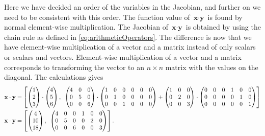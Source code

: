 Here we have decided an order of the variables in the Jacobian, and further on we need to be consistent with this order. The function value of $\textbf{x}\cdot\textbf{y}$ is found by normal element-wise multiplication. The Jacobian of $\textbf{x}\cdot\textbf{y}$ is obtained by using the chain rule as defined in \eqref{eq:arithmeticOperators}. The difference is now that we have element-wise multiplication of a vector and a matrix instead of only scalars or scalars and vectors. Element-wise multiplication of a vector and a matrix corresponds to transforming the vector to an $n\times n$ matrix with the values on the diagonal. The calculations gives
\begin{align*}
    \textbf{x}\cdot\textbf{y} &= \left[\begin{pmatrix}
        1\\2\\3
        \end{pmatrix}
        \cdot
        \begin{pmatrix}
        4\\5\\6
        \end{pmatrix}
    ,\hspace{0.5em}
        \begin{pmatrix}
        4&0&0\\
        0&5&0\\
        0&0&6\end{pmatrix}
        \cdot
        \begin{pmatrix}
        1&0&0&0&0&0\\
        0&1&0&0&0&0\\
        0&0&1&0&0&0
        \end{pmatrix}
        +
        \begin{pmatrix}
        1&0&0\\
        0&2&0\\
        0&0&3
        \end{pmatrix}
        \cdot
        \begin{pmatrix}
        0&0&0&1&0&0\\
        0&0&0&0&1&0\\
        0&0&0&0&0&1
        \end{pmatrix}\right]
        \\
        \textbf{x}\cdot\textbf{y} &= \left[
        \begin{pmatrix}
        4\\10\\18
        \end{pmatrix}
        ,\hspace{0.5em}
        \begin{pmatrix}
        4&0&0&1&0&0\\
        0&5&0&0&2&0\\
        0&0&6&0&0&3
        \end{pmatrix}
        \right].
\end{align*}
